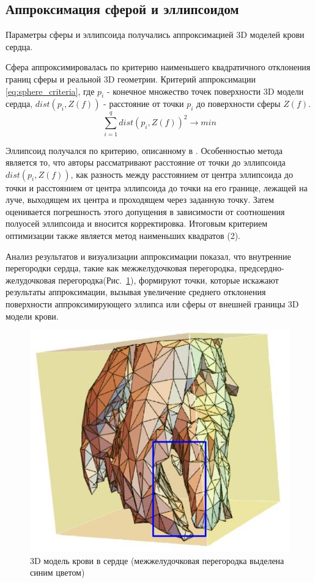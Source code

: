 \documentclass[conference]{IEEEtran}
\begin{document}
\subsection{Аппроксимация сферой и эллипсоидом}
Параметры сферы и эллипсоида получались аппроксимацией 3D моделей крови сердца.

Сфера аппроксимировалась по критерию наименьшего квадратичного отклонения границ сферы и реальной 3D геометрии.
Критерий аппроксимации \ref{eq:sphere_criteria},
где $ p_i$ - конечное множество точек поверхности 3D модели сердца,
$dist(p_i,Z(f))$ - расстояние от точки $ p_i$ до поверхности сферы $Z(f)$.
\begin{equation}
    \sum_{i=1}^{q}dist(p_i,Z(f))^2 \rightarrow min
    \label{eq:sphere_criteria}
\end{equation}

Эллипсоид получался по критерию, описанному в .
Особенностью метода является то, что авторы рассматривают расстояние от точки до эллипсоида
$dist(p_i,Z(f))$, как разность между расстоянием от центра эллипсоида до точки и расстоянием от центра
эллипсоида до точки на его границе, лежащей на луче, выходящем их центра и проходящем через заданную точку.
Затем оценивается погрешность этого допущения в зависимости от соотношения полуосей эллипсоида и вносится корректировка.
Итоговым критерием оптимизации также является метод наименьших квадратов (2).

Анализ результатов и визуализации аппроксимации показал, что внутренние перегородки сердца, такие как межжелудочковая перегородка,
предсердно-желудочковая перегородка(Рис.~\ref{fig:wall}), формируют точки, которые искажают результаты аппроксимации,
вызывая увеличение среднего отклонения поверхности аппроксимирующего эллипса или сферы от внешней границы 3D модели крови.

\begin{figure}[tbph]
    \centering
    \includegraphics[width=0.8\linewidth]{fig/wall}
    \caption{3D модель крови в сердце (межжелудочковая перегородка выделена синим
    цветом)}
    \label{fig:wall}
\end{figure}
\end{document}
